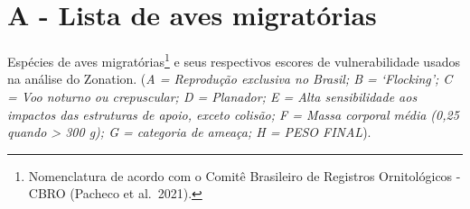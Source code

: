 \documentclass[
  oneside]{scrbook}
\begin{document}
\hypertarget{apendice}{%
\appendix}


\pagestyle{headings}

\hypertarget{a---lista-de-aves-migratuxf3rias}{%
\chapter{A - Lista de aves migratórias}\label{a---lista-de-aves-migratuxf3rias}}

\hspace{1.5cm}

Espécies de aves migratórias\footnote{Nomenclatura de acordo com o Comitê Brasileiro de Registros Ornitológicos - CBRO (Pacheco et al.~2021).} e seus respectivos escores de vulnerabilidade usados na análise do Zonation. (\emph{A = Reprodução exclusiva no Brasil; B = `Flocking'; C = Voo noturno ou crepuscular; D = Planador; E = Alta sensibilidade aos impactos das estruturas de apoio, exceto colisão; F = Massa corporal média (0,25 quando \textgreater{} 300 g); G = categoria de ameaça; H = PESO FINAL}).

\hspace{1.0cm}
\end{document}
